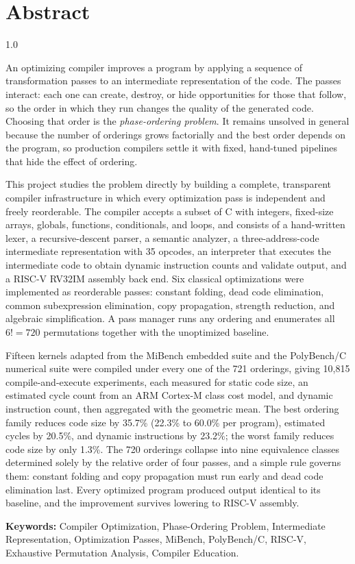 \chapter*{Abstract}
\begin{spacing}{1.0}

An optimizing compiler improves a program by applying a sequence of transformation passes to an intermediate representation of the code. The passes interact: each one can create, destroy, or hide opportunities for those that follow, so the order in which they run changes the quality of the generated code. Choosing that order is the \emph{phase-ordering problem}. It remains unsolved in general because the number of orderings grows factorially and the best order depends on the program, so production compilers settle it with fixed, hand-tuned pipelines that hide the effect of ordering.

This project studies the problem directly by building a complete, transparent compiler infrastructure in which every optimization pass is independent and freely reorderable. The compiler accepts a subset of C with integers, fixed-size arrays, globals, functions, conditionals, and loops, and consists of a hand-written lexer, a recursive-descent parser, a semantic analyzer, a three-address-code intermediate representation with 35 opcodes, an interpreter that executes the intermediate code to obtain dynamic instruction counts and validate output, and a RISC-V RV32IM assembly back end. Six classical optimizations were implemented as reorderable passes: constant folding, dead code elimination, common subexpression elimination, copy propagation, strength reduction, and algebraic simplification. A pass manager runs any ordering and enumerates all $6! = 720$ permutations together with the unoptimized baseline.

Fifteen kernels adapted from the MiBench embedded suite and the PolyBench/C numerical suite were compiled under every one of the 721 orderings, giving 10{,}815 compile-and-execute experiments, each measured for static code size, an estimated cycle count from an ARM Cortex-M class cost model, and dynamic instruction count, then aggregated with the geometric mean. The best ordering family reduces code size by 35.7\% (22.3\% to 60.0\% per program), estimated cycles by 20.5\%, and dynamic instructions by 23.2\%; the worst family reduces code size by only 1.3\%. The 720 orderings collapse into nine equivalence classes determined solely by the relative order of four passes, and a simple rule governs them: constant folding and copy propagation must run early and dead code elimination last. Every optimized program produced output identical to its baseline, and the improvement survives lowering to RISC-V assembly.
\end{spacing}

\vspace{0.5em}

\noindent\textbf{Keywords:} Compiler Optimization, Phase-Ordering Problem, Intermediate Representation, Optimization Passes, MiBench, PolyBench/C, RISC-V, Exhaustive Permutation Analysis, Compiler Education.

